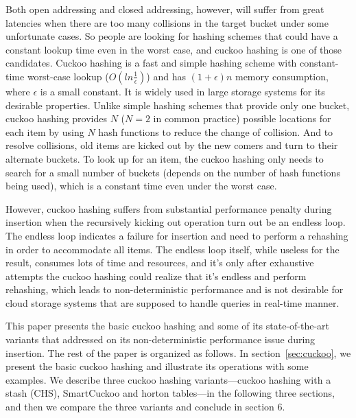 \documentclass[runningheads]{llncs}
\begin{document}
Both open addressing and closed addressing, however, will suffer from great latencies when there are too many collisions in the target bucket under some unfortunate cases. So people are looking for hashing schemes that could have a constant lookup time even in the worst case, and cuckoo hashing is one of those candidates. Cuckoo hashing is a fast and simple hashing scheme with constant-time worst-case lookup ($O(ln\frac{1}{\epsilon})$) and has $(1+\epsilon)n$ memory consumption, where $\epsilon$ is a small constant. It is widely used in large storage systems for its desirable properties. Unlike simple hashing schemes that provide only one bucket, cuckoo hashing provides $N$ ($N=2$ in common practice) possible locations for each item by using $N$ hash functions to reduce the change of collision. And to resolve collisions, old items are kicked out by the new comers and turn to their alternate buckets. To look up for an item, the cuckoo hashing only needs to search for a small number of buckets (depends on the number of hash functions being used), which is a constant time even under the worst case.

However, cuckoo hashing suffers from substantial performance penalty during insertion when the recursively kicking out operation turn out be an endless loop. The endless loop indicates a failure for insertion and need to perform a rehashing in order to accommodate all items. The endless loop itself, while useless for the result, consumes lots of time and resources, and it's only after exhaustive attempts the cuckoo hashing could realize that it's endless and perform rehashing, which leads to non-deterministic performance and is not desirable for cloud storage systems that are supposed to handle queries in real-time manner. 

This paper presents the basic cuckoo hashing and some of its state-of-the-art variants that addressed on its non-deterministic performance issue during insertion. The rest of the paper is organized as follows. In section~\ref{sec:cuckoo}, we present the basic cuckoo hashing and illustrate its operations with some examples. We describe three cuckoo hashing variants---cuckoo hashing with a stash (CHS), SmartCuckoo and horton tables---in the following three sections, and then we compare the three variants and conclude in section 6.
\end{document}
